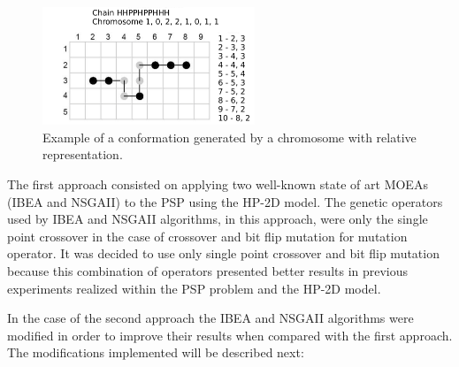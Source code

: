 \begin{figure}[ht]
	\centering
	\includegraphics[width=2.5in]{figures/figure3.png}
	\caption{Example of a conformation generated by a chromosome with relative representation.}
	\label{fig_sim}
\end{figure}


The first approach consisted on applying two well-known state of art MOEAs (IBEA and NSGAII) to the PSP using the HP-2D model. The genetic operators used by IBEA and NSGAII algorithms, in this approach, were only the single point crossover in the case of crossover and bit flip mutation for mutation operator.  It was decided to use only single point crossover and bit flip mutation because this combination of operators presented better results in previous experiments realized within the PSP problem and the HP-2D model.

In the case of the second approach the IBEA and NSGAII algorithms were modified in order to improve their results when compared with the first approach. The modifications implemented will be described next:

